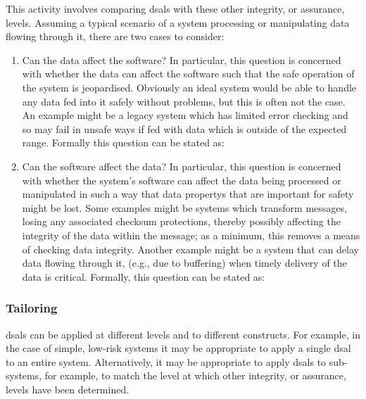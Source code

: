 This activity involves comparing \glspl{dsal} with these other \gls{integrity}, or assurance, levels. Assuming a typical scenario of a system processing or manipulating data flowing through it, there are two cases to consider:

\begin{enumerate}
  \item Can the data affect the software? In particular, this question is concerned with whether the data can affect the software such that the safe operation of the system is jeopardised. Obviously an ideal system would be able to handle any data fed into it safely without problems, but this is often not the case. An example might be a legacy system which has limited error checking and so may fail in unsafe ways if fed with data which is outside of the expected range. Formally this question can be stated as: 
  \item Can the software affect the data? In particular, this question is concerned with whether the system's software can affect the data being processed or manipulated in such a way that \glspl{data property} that are important for safety might be lost. Some examples might be systems which transform messages, losing any associated checksum protections, thereby possibly affecting the \gls{integrity} of the data within the message; as a minimum, this removes a means of checking data \gls{integrity}. Another example might be a system that can delay data flowing through it, (e.g., due to buffering) when timely delivery of the data is critical. Formally, this question can be stated as: 
\end{enumerate}

\subsubsection{Tailoring}\label{bkm:activities:analyse:tailoring}
\glspl{dsal} can be applied at different levels and to different constructs. For example, in the case of simple, low-risk systems it may be appropriate to apply a single \gls{dsal} to an entire system. Alternatively, it may be appropriate to apply \glspl{dsal} to sub-systems, for example, to match the level at which other \gls{integrity}, or assurance, levels have been determined. 

